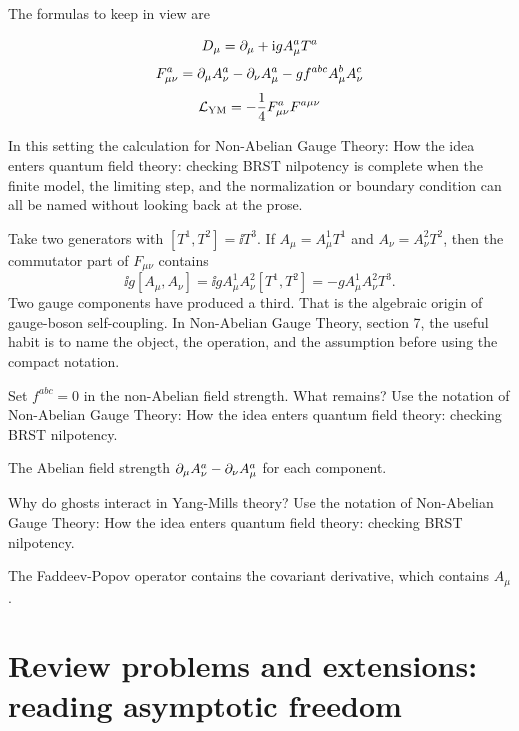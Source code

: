 The formulas to keep in view are

\[
  D_\mu=\partial_\mu+\mathrm i gA_\mu^aT^a
\]
\[
  F_{\mu\nu}^a=\partial_\mu A_\nu^a-\partial_\nu A_\mu^a-gf^{abc}A_\mu^bA_\nu^c
\]
\[
  \mathcal L_{\mathrm{YM}}=-\frac14F_{\mu\nu}^aF^{a\mu\nu}
\]

In this setting the calculation for Non-Abelian Gauge Theory: How the idea enters quantum field theory: checking BRST nilpotency is complete when the finite model, the limiting step, and the normalization or boundary condition can all be named without looking back at the prose.




\begin{example}
Take two generators with \([T^1,T^2]=\ii T^3\).  If \(A_\mu=A_\mu^1T^1\) and \(A_\nu=A_\nu^2T^2\), then the commutator part of \(F_{\mu\nu}\) contains
\[
  \ii g[A_\mu,A_\nu]=\ii gA_\mu^1A_\nu^2[T^1,T^2]=-gA_\mu^1A_\nu^2T^3.
\]
Two gauge components have produced a third.  That is the algebraic origin of gauge-boson self-coupling.  In Non-Abelian Gauge Theory, section 7, the useful habit is to name the object, the operation, and the assumption before using the compact notation.
\end{example}



\begin{exercise}
Set \(f^{abc}=0\) in the non-Abelian field strength.  What remains?  Use the notation of Non-Abelian Gauge Theory: How the idea enters quantum field theory: checking BRST nilpotency.
\begin{answer}
The Abelian field strength \(\partial_\mu A_\nu^a-\partial_\nu A_\mu^a\) for each component.
\end{answer}
\end{exercise}

\begin{exercise}
Why do ghosts interact in Yang-Mills theory?  Use the notation of Non-Abelian Gauge Theory: How the idea enters quantum field theory: checking BRST nilpotency.
\begin{answer}
The Faddeev-Popov operator contains the covariant derivative, which contains \(A_\mu\).
\end{answer}
\end{exercise}



\section{Review problems and extensions: reading asymptotic freedom}

